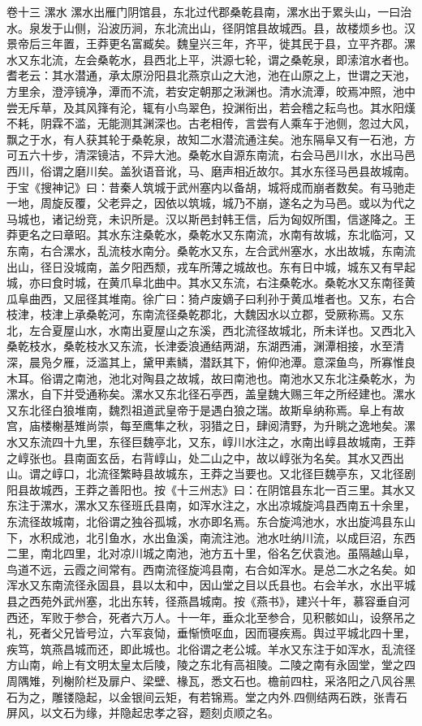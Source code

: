 \documentclass[12pt,UTF8]{ctexbook}
\begin{document}
卷十三  漯水 
漯水出雁门阴馆县，东北过代郡桑乾县南，漯水出于累头山，一曰治水。泉发于山侧，沿波历涧，东北流出山，径阴馆县故城西。县，故楼烦乡也。汉景帝后三年置，王莽更名富臧矣。魏皇兴三年，齐平，徙其民于县，立平齐郡。漯水又东北流，左会桑乾水，县西北上平，洪源七轮，谓之桑乾泉，即溹涫水者也。耆老云：其水潜通，承太原汾阳县北燕京山之大池，池在山原之上，世谓之天池，方里余，澄渟镜净，潭而不流，若安定朝那之湫渊也。清水流潭，皎焉冲照，池中尝无斥草，及其风箨有沦，辄有小鸟翠色，投渊衔出，若会稽之耘鸟也。其水阳熯不耗，阴霖不滥，无能测其渊深也。古老相传，言尝有人乘车于池侧，忽过大风，飘之于水，有人获其轮于桑乾泉，故知二水潜流通注矣。池东隔阜又有一石池，方可五六十步，清深镜洁，不异大池。桑乾水自源东南流，右会马邑川水，水出马邑西川，俗谓之磨川矣。盖狄语音讹，马、磨声相近故尔。其水东径马邑县故城南。于宝《搜神记》曰：昔秦人筑城于武州塞内以备胡，城将成而崩者数矣。有马驰走一地，周旋反覆，父老异之，因依以筑城，城乃不崩，遂名之为马邑。或以为代之马城也，诸记纷竞，未识所是。汉以斯邑封韩王信，后为匈奴所围，信遂降之。王莽更名之曰章昭。其水东注桑乾水，桑乾水又东南流，水南有故城，东北临河，又东南，右合漯水，乱流枝水南分。桑乾水又东，左合武州塞水，水出故城，东南流出山，径日没城南，盖夕阳西颓，戎车所薄之城故也。东有日中城，城东又有早起城，亦曰食时城，在黄爪阜北曲中。其水又东流，右注桑乾水。桑乾水又东南径黄瓜阜曲西，又屈径其堆南。徐广曰：猗卢废嫡子曰利孙于黄瓜堆者也。又东，右合枝津，枝津上承桑乾河，东南流径桑乾郡北，大魏因水以立郡，受厥称焉。又东北，左合夏屋山水，水南出夏屋山之东溪，西北流径故城北，所未详也。又西北入桑乾枝水，桑乾枝水又东流，长津委浪通结两湖，东湖西浦，渊潭相接，水至清深，晨凫夕雁，泛滥其上，黛甲素鳞，潜跃其下，俯仰池潭。意深鱼鸟，所寡惟良木耳。俗谓之南池，池北对陶县之故城，故曰南池也。南池水又东北注桑乾水，为漯水，自下并受通称矣。漯水又东北径石亭西，盖皇魏大赐三年之所经建也。漯水又东北径白狼堆南，魏烈祖道武皇帝于是遇白狼之瑞。故斯阜纳称焉。阜上有故宫，庙楼榭基雉尚崇，每至鹰隼之秋，羽猎之日，肆阅清野，为升眺之逸地矣。漯水又东流四十九里，东径巨魏亭北，又东，崞川水注之，水南出崞县故城南，王莽之崞张也。县南面玄岳，右背崞山，处二山之中，故以崞张为名矣。其水又西出山。谓之崞口，北流径繁畤县故城东，王莽之当要也。又北径巨魏亭东，又北径剧阳县故城西，王莽之善阳也。按《十三州志》曰：在阴馆县东北一百三里。其水又东注于漯水，漯水又东径班氏县南，如浑水注之，水出凉城旋鸿县西南五十余里，东流径故城南，北俗谓之独谷孤城，水亦即名焉。东合旋鸿池水，水出旋鸿县东山下，水积成池，北引鱼水，水出鱼溪，南流注池。池水吐纳川流，以成巨沼，东西二里，南北四里，北对凉川城之南池，池方五十里，俗名乞伏袁池。虽隔越山阜，鸟道不远，云霞之间常有。西南流径旋鸿县南，右合如浑水。是总二水之名矣。如浑水又东南流径永固县，县以太和中，因山堂之目以氏县也。右会羊水，水出平城县之西苑外武州塞，北出东转，径燕昌城南。按《燕书》，建兴十年，慕容垂自河西还，军败于参合，死者六万人。十一年，垂众北至参合，见积骸如山，设祭吊之礼，死者父兄皆号泣，六军哀恸，垂惭愤呕血，因而寝疾焉。舆过平城北四十里，疾笃，筑燕昌城而还，即此城也。北俗谓之老公城。羊水又东注于如浑水，乱流径方山南，岭上有文明太皇太后陵，陵之东北有高祖陵。二陵之南有永固堂，堂之四周隅雉，列榭阶栏及扉户、梁壁、椽瓦，悉文石也。檐前四柱，采洛阳之八风谷黑石为之，雕镂隐起，以金银间云矩，有若锦焉。堂之内外.四侧结两石跌，张青石屏风，以文石为缘，并隐起忠孝之容，题刻贞顺之名。
\end{document}
